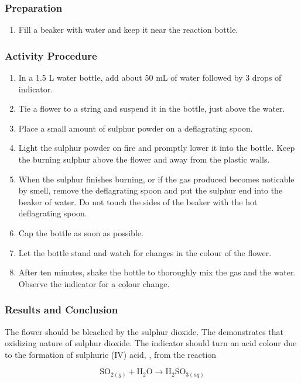 \subsubsection{Preparation}
\begin{enumerate}
\item{Fill a beaker with water and keep it near the reaction bottle.}
\end{enumerate}

\subsubsection{Activity Procedure}
\begin{enumerate}
\item{In a 1.5 L water bottle, add about 50 mL of water followed by 3 drops of indicator.}
\item{Tie a flower to a string and suspend it in the bottle, just above the water.}
\item{Place a small amount of sulphur powder on a deflagrating spoon.}
\item{Light the sulphur powder on fire and promptly lower it into the bottle. Keep the burning sulphur above the flower and away from the plastic walls.}
\item{When the sulphur finishes burning, or if the gas produced becomes noticable by smell, remove the deflagrating spoon and put the sulphur end into the beaker of water. Do not touch the sides of the beaker with the hot deflagrating spoon.}
\item{Cap the bottle as soon as possible.}
\item{Let the bottle stand and watch for changes in the colour of the flower.}
\item{After ten minutes, shake the bottle to thoroughly mix the gas and the water. Observe the indicator for a colour change.}
\end{enumerate}

\subsubsection{Results and Conclusion}
The flower should be bleached by the sulphur dioxide. The demonstrates that oxidizing nature of sulphur dioxide. The indicator should turn an acid colour due to the formation of sulphuric (IV) acid, , from the reaction

$$\mathrm{SO}_{2(g)} + \mathrm{H}_2\mathrm{O} \longrightarrow \mathrm{H}_2\mathrm{SO}_{3(aq)}$$

